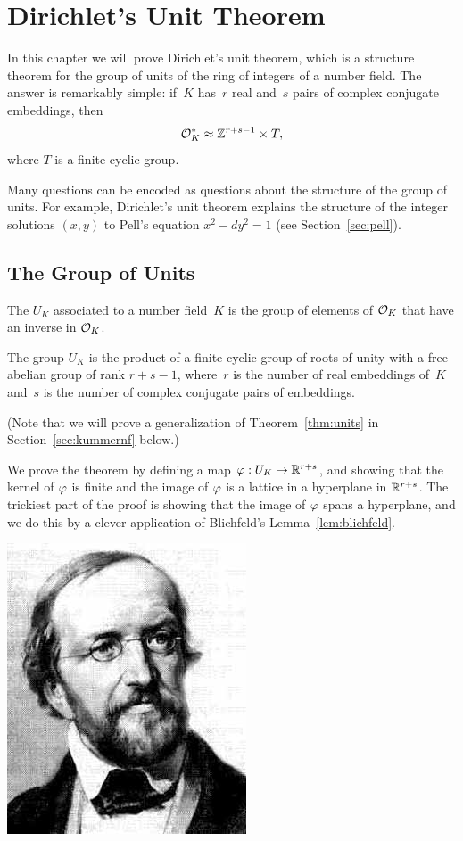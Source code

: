 \chapter{Dirichlet's Unit Theorem}
In this chapter we will prove Dirichlet's unit theorem, 
which is a structure theorem for the group
of units of the ring of integers of a number field.  The answer is
remarkably simple: if~$K$ has~$r$ real and~$s$ pairs of
complex conjugate embeddings,
then 
$$
\mathcal{O}_K^*\approx \mathbb{Z}^{r+s-1} \times T,
$$
where $T$ is a finite cyclic group.

Many questions can be encoded as questions about the structure of the
group of units.  For example, Dirichlet's unit theorem explains
the structure of the  integer solutions $(x,y)$ to Pell's equation $x^2-dy^2=1$
(see Section~\ref{sec:pell}).


\section{The Group of Units}
\begin{definition}
The  $U_K$ associated to a number field~$K$ is the
group of elements of $\mathcal{O}_K$ that have an inverse in $\mathcal{O}_K$.
\end{definition}

\begin{theorem}[Dirichlet]\label{thm:units}
The group $U_K$ is the product of a finite cyclic group of roots of
unity with a free abelian group of rank $r+s-1$, where~$r$ is the
number of real embeddings of~$K$ and~$s$ is the number of complex
conjugate pairs of embeddings.
\end{theorem}
(Note that we will prove a generalization of Theorem~\ref{thm:units} in
Section~\ref{sec:kummernf} below.)

We prove the theorem by defining a map $\varphi:U_K\to \mathbb{R}^{r+s}$, and
showing that the kernel of $\varphi$ is finite and the image of $\varphi$
is a lattice in a hyperplane in $\mathbb{R}^{r+s}$.  The trickiest part of the
proof is showing that the image of $\varphi$ spans a hyperplane, and we
do this by a clever application of Blichfeld's Lemma~\ref{lem:blichfeld}.

\begin{center}
\includegraphics[width=.3\textwidth]{graphics/dirichlet}
\end{center}


